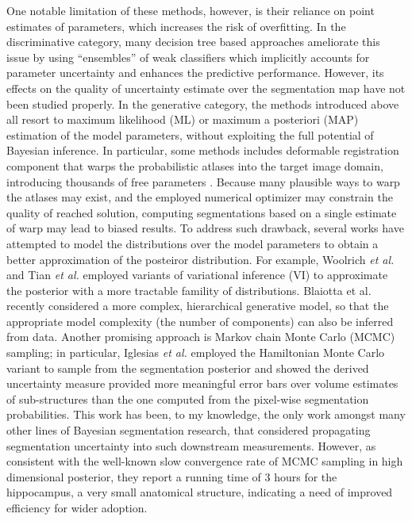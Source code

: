One notable limitation of these methods, however, is their reliance on point estimates of parameters, which increases the risk of overfitting. In the discriminative category, many decision tree based approaches ameliorate this issue by using ``ensembles'' of weak classifiers \cite{iglesias2011combining,criminisi2011discriminative,criminisi2009decision,montillo2011entangled,le2016lifted} which implicitly accounts for parameter uncertainty and enhances the predictive performance. However, its effects on the quality of uncertainty estimate over the segmentation map have not been studied properly. In the generative category, the methods introduced above all resort to maximum likelihood (ML) or maximum a posteriori (MAP) estimation of the model parameters, without exploiting the full potential of Bayesian inference. In particular, some methods includes deformable registration component that warps the probabilistic atlases into the target image domain, introducing thousands of free parameters \cite{pohl2006bayesian,ashburner2005unified,van2009automated,sabuncu2010generative,cardoso2011load}. Because many plausible ways to warp the atlases may exist, and the employed numerical optimizer may constrain the quality of reached solution, computing segmentations based on a single estimate of warp may lead to biased results. To address such drawback, several works have attempted to model the distributions over the model parameters to obtain a better approximation of the posteiror distribution. For example, Woolrich \textit{et al.} \cite{woolrich2006variational} and Tian \textit{et al.} \cite{tian2011hybrid} employed variants of variational inference (VI) to approximate the posterior with a more tractable famility of distributions. Blaiotta et al. \cite{blaiotta2016variational} recently considered a more complex, hierarchical generative model, so that the appropriate model complexity (the number of components) can also be inferred from data. Another promising approach is Markov chain Monte Carlo (MCMC) sampling; in particular, Iglesias \textit{et al.} \cite{iglesias2012incorporating,iglesias2013improved} employed the Hamiltonian Monte Carlo variant to sample from the segmentation posterior and showed the derived uncertainty measure provided more meaningful error bars over volume estimates of sub-structures than the one computed from the pixel-wise segmentation probabilities. This work has been, to my knowledge, the only work amongst many other lines of Bayesian segmentation research, that considered propagating segmentation uncertainty into such downstream measurements. However, as consistent with the well-known slow convergence rate of MCMC sampling in high dimensional posterior, they report a running time of $3$ hours for the hippocampus, a very small anatomical structure, indicating a need of improved efficiency for wider adoption. 




